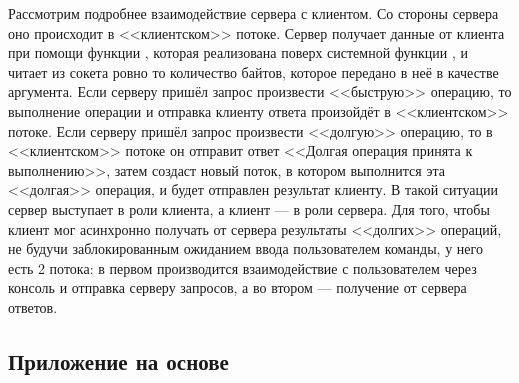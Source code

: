 Рассмотрим подробнее взаимодействие сервера с клиентом. Со стороны сервера оно происходит в <<клиентском>> потоке. Сервер получает данные от клиента при помощи функции , которая реализована поверх системной функции , и читает из сокета ровно то количество байтов, которое передано в неё в качестве аргумента. Если серверу пришёл запрос произвести <<быструю>> операцию, то выполнение операции и отправка клиенту ответа произойдёт в <<клиентском>> потоке. Если серверу пришёл запрос произвести <<долгую>> операцию, то в <<клиентском>> потоке он отправит ответ <<Долгая операция принята к выполнению>>, затем создаст новый поток, в котором выполнится эта <<долгая>> операция, и будет отправлен результат клиенту. В такой ситуации сервер выступает в роли клиента, а клиент --- в роли сервера. Для того, чтобы клиент мог асинхронно получать от сервера результаты <<долгих>> операций, не будучи заблокированным ожиданием ввода пользователем команды, у него есть 2 потока: в первом производится взаимодействие с пользователем через консоль и отправка серверу запросов, а во втором --- получение от сервера ответов.

\subsection{Приложение на основе }

